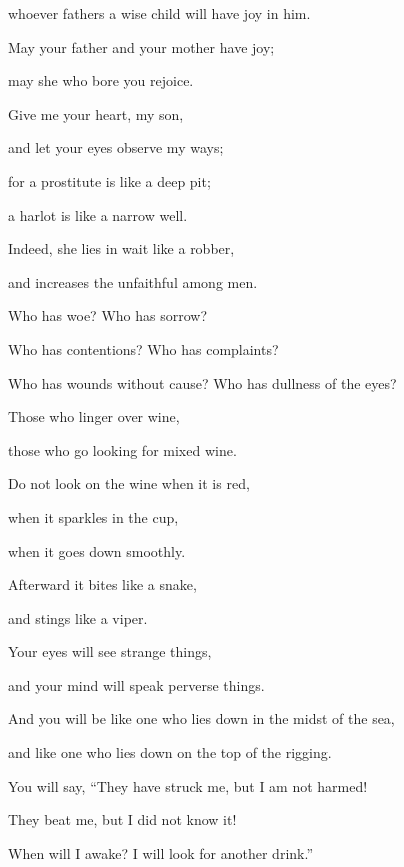 {\par }{\Q whoever
fathers
a wise
child
will have joy
in him.
\par }{\Q {}May your father
and your mother
have joy;
\par }{\Q may
she who bore
you rejoice.
\par }{\Q {}Give
me your heart,
my son,
\par }{\Q and let your eyes
observe
my ways;
\par }{\Q {}for
a prostitute is like a deep
pit;
\par }{\Q a harlot
is like a narrow
well.
\par }{\Q {}Indeed,
she
lies in wait
like a robber,
\par }{\Q and increases
the unfaithful
among men.
\par }{\Q {}Who
has woe? Who
has sorrow?
\par }{\Q Who
has contentions? Who
has complaints?
\par }{\Q Who
has wounds
without cause? Who
has dullness
of the eyes?
\par }{\Q {}Those who linger
over
wine,
\par }{\Q those who go
looking for
mixed wine.
\par }{\Q {}Do not
look
on the wine
when
it is red,
\par }{\Q when
it sparkles
in the cup,
\par }{\Q when it goes down
smoothly.
\par }{\Q {}Afterward
it bites
like a snake,
\par }{\Q and stings
like a viper.
\par }{\Q {}Your eyes
will see
strange
things,

\par }{\Q and your mind
will speak
perverse things.
\par }{\Q {}And you will be
like one who lies down
in the midst
of the sea,
\par }{\Q and like one who lies down on
the top
of the rigging.
\par }{\Q {}You will say, “They
have struck
me, but
I am
not
harmed!
\par }{\Q They
beat me, but
I did not
know
it!

\par }{\Q When
will I awake? I will look
for another drink.”

}
